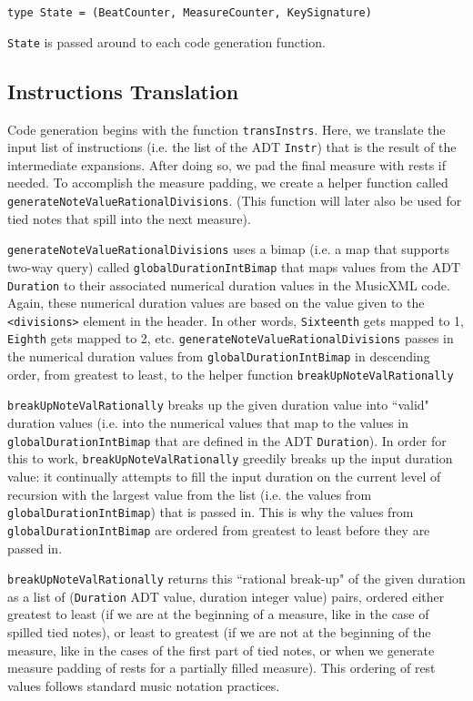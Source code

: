 \documentclass{report}
\begin{document}
\verb.type State = (BeatCounter, MeasureCounter, KeySignature). 

\noindent\verb.State. is passed around to each code generation function. 

\subsection{Instructions Translation}

Code generation begins with the function \verb.transInstrs.. Here, we translate the input list of instructions (i.e. the list of the ADT \verb.Instr.) that is the result of the intermediate expansions. After doing so, we pad the final measure with rests if needed. To accomplish the measure padding, we create a helper function called \verb.generateNoteValueRationalDivisions.. (This function will later also be used for tied notes that spill into the next measure).

\verb.generateNoteValueRationalDivisions. uses a bimap (i.e. a map that supports two-way query) called \verb.globalDurationIntBimap. that maps values from the ADT \verb.Duration. to their associated numerical duration values in the MusicXML code. Again, these numerical duration values are based on the value given to the \verb.<divisions>. element in the header. In other words, \verb.Sixteenth. gets mapped to 1, \verb.Eighth. gets mapped to 2, etc. \verb.generateNoteValueRationalDivisions. passes in the numerical duration values from \verb.globalDurationIntBimap. in descending order, from greatest to least, to the helper function \verb.breakUpNoteValRationally. 

 \verb.breakUpNoteValRationally. breaks up the given duration value into ``valid" duration values (i.e. into the numerical values that map to the values  in \verb.globalDurationIntBimap. that are defined in the ADT \verb.Duration.). In order for this to work,  \verb.breakUpNoteValRationally. greedily breaks up the input duration value: it continually attempts to fill the input duration on the current level of recursion with the largest value from the list (i.e. the values from \verb.globalDurationIntBimap.) that is passed in. This is why the values from \verb.globalDurationIntBimap. are ordered from greatest to least before they are passed in. 

\verb.breakUpNoteValRationally. returns this ``rational break-up" of the given duration as a list of (\verb.Duration. ADT value, duration integer value) pairs, ordered either greatest to least (if we are at the beginning of a measure, like in the case of spilled  tied notes), or least to greatest (if we are not at the beginning of the measure, like in the cases of the first part of tied notes, or when we generate measure padding of rests for a partially filled measure). This ordering of rest values follows standard music notation practices. 
\end{document}
